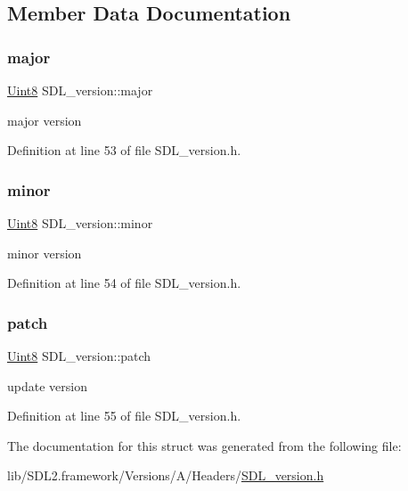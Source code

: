 \subsection{Member Data Documentation}
\mbox{\label{struct_s_d_l__version_ad7d7674532073eed237b90f546c97cd0}} 
\subsubsection{\texorpdfstring{major}{major}}
{\footnotesize\ttfamily \mbox{\hyperlink{_s_d_l__stdinc_8h_a2944638813a090aa23e62f4da842c3e2}{Uint8}} S\+D\+L\+\_\+version\+::major}

major version 

Definition at line 53 of file S\+D\+L\+\_\+version.\+h.

\mbox{\label{struct_s_d_l__version_a6c35c7bf80245028d5970e6a504ecf57}} 
\subsubsection{\texorpdfstring{minor}{minor}}
{\footnotesize\ttfamily \mbox{\hyperlink{_s_d_l__stdinc_8h_a2944638813a090aa23e62f4da842c3e2}{Uint8}} S\+D\+L\+\_\+version\+::minor}

minor version 

Definition at line 54 of file S\+D\+L\+\_\+version.\+h.

\mbox{\label{struct_s_d_l__version_aa6dacff18edee8cd037c773b843be0f1}} 
\subsubsection{\texorpdfstring{patch}{patch}}
{\footnotesize\ttfamily \mbox{\hyperlink{_s_d_l__stdinc_8h_a2944638813a090aa23e62f4da842c3e2}{Uint8}} S\+D\+L\+\_\+version\+::patch}

update version 

Definition at line 55 of file S\+D\+L\+\_\+version.\+h.



The documentation for this struct was generated from the following file\+:\begin{DoxyCompactItemize}
\item 
lib/\+S\+D\+L2.\+framework/\+Versions/\+A/\+Headers/\mbox{\hyperlink{_s_d_l__version_8h}{S\+D\+L\+\_\+version.\+h}}\end{DoxyCompactItemize}
